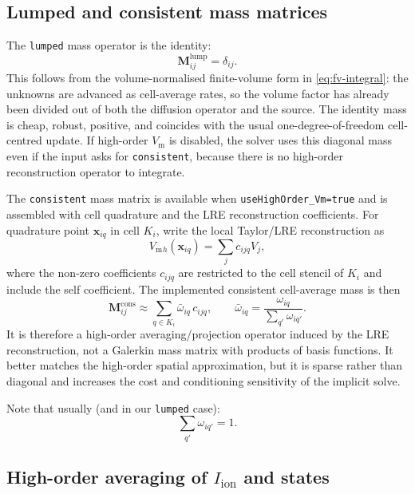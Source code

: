 \documentclass[11pt,a4paper]{article}
\newcommand{\code}[1]{\texttt{\small #1}}
\newcommand{\Vm}{V_{\text{m}}}
\newcommand{\Iion}{I_{\mathrm{ion}}}
\newcommand{\Mmass}{\mathbf{M}}
\begin{document}
\subsection{Lumped and consistent mass matrices}

The \code{lumped} mass operator is the identity:
\begin{equation}
  \Mmass^{\mathrm{lump}}_{ij}
  =
  \delta_{ij}.
  \label{eq:lumped}
\end{equation}
This follows from the volume-normalised finite-volume form in
\eqref{eq:fv-integral}: the unknowns are advanced as cell-average rates, so
the volume factor has already been divided out of both the diffusion operator
and the source. The identity mass is cheap, robust, positive, and coincides
with the usual one-degree-of-freedom cell-centred update. If high-order $\Vm$
is disabled, the solver uses this diagonal mass even if the input asks for
\code{consistent}, because there is no high-order reconstruction operator to
integrate.

The \code{consistent} mass matrix is available when \code{useHighOrder\_Vm=true}
and is assembled with cell quadrature and the LRE reconstruction coefficients.
For quadrature point $\mathbf{x}_{iq}$ in cell $K_i$, write the local Taylor/LRE
reconstruction as
\begin{equation}
  \Vm{}_{h}(\mathbf{x}_{iq})
  =
  \sum_j c_{ijq} V_j ,
\end{equation}
where the non-zero coefficients $c_{ijq}$ are restricted to the cell stencil
of $K_i$ and include the self coefficient. The implemented consistent
cell-average mass is then
\begin{equation}
  \Mmass^{\mathrm{cons}}_{ij}
  \approx
  \sum_{q\in K_i}
  \bar{\omega}_{iq}\,c_{ijq},
  \qquad
  \bar{\omega}_{iq}
  =
  \frac{\omega_{iq}}{\sum_{q'}\omega_{iq'}}.
  \label{eq:consistent}
\end{equation}
It is therefore a high-order averaging/projection operator induced by the LRE
reconstruction, not a Galerkin mass matrix with products of basis functions.
It better matches the high-order spatial approximation, but it is sparse
rather than diagonal and increases the cost and conditioning sensitivity of
the implicit solve.

Note that usually (and in our \code{lumped} case):
\begin{equation}
\sum_{q'}\omega_{iq'}=1.
\end{equation}

\subsection{High-order averaging of \texorpdfstring{$\Iion$}{Iion} and states}
\label{sec:iion-quad}
\end{document}
